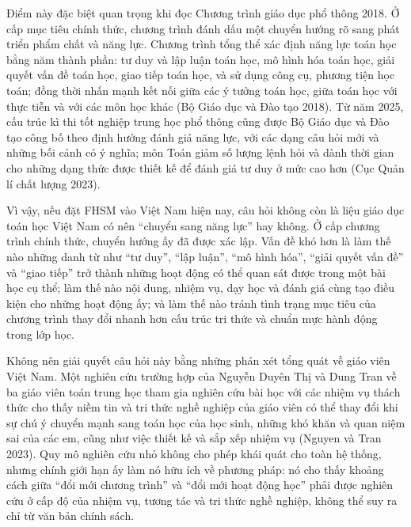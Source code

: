 Điểm này đặc biệt quan trọng khi đọc Chương trình giáo dục phổ thông 2018.
Ở cấp mục tiêu chính thức, chương trình đánh dấu một chuyển hướng rõ sang
phát triển phẩm chất và năng lực. Chương trình tổng thể xác định năng lực toán
học bằng năm thành phần: tư duy và lập luận toán học, mô hình hóa toán học,
giải quyết vấn đề toán học, giao tiếp toán học, và sử dụng công cụ, phương tiện
học toán; đồng thời nhấn mạnh kết nối giữa các ý tưởng toán học, giữa toán học
với thực tiễn và với các môn học khác (Bộ Giáo dục và Đào tạo 2018). Từ năm
2025, cấu trúc kì thi tốt nghiệp trung học phổ thông cũng được Bộ Giáo dục và
Đào tạo công bố theo định hướng đánh giá năng lực, với các dạng câu hỏi mới và
những bối cảnh có ý nghĩa; môn Toán giảm số lượng lệnh hỏi và dành thời gian
cho những dạng thức được thiết kế để đánh giá tư duy ở mức cao hơn
(Cục Quản lí chất lượng 2023).

Vì vậy, nếu đặt FHSM vào Việt Nam hiện nay, câu hỏi không còn là liệu giáo dục
toán học Việt Nam có nên ``chuyển sang năng lực'' hay không. Ở cấp chương
trình chính thức, chuyển hướng ấy đã được xác lập. Vấn đề khó hơn là làm thế
nào những danh từ như ``tư duy'', ``lập luận'', ``mô hình hóa'', ``giải quyết
vấn đề'' và ``giao tiếp'' trở thành những hoạt động có thể quan sát được trong
một bài học cụ thể; làm thế nào nội dung, nhiệm vụ, dạy học và đánh giá cùng
tạo điều kiện cho những hoạt động ấy; và làm thế nào tránh tình trạng mục tiêu
của chương trình thay đổi nhanh hơn cấu trúc tri thức và chuẩn mực hành động
trong lớp học.

Không nên giải quyết câu hỏi này bằng những phán xét tổng quát về giáo viên
Việt Nam. Một nghiên cứu trường hợp của Nguyễn Duyên Thị và Dung Tran về ba
giáo viên toán trung học tham gia nghiên cứu bài học với các nhiệm vụ thách
thức cho thấy niềm tin và tri thức nghề nghiệp của giáo viên có thể thay đổi
khi sự chú ý chuyển mạnh sang toán học của học sinh, những khó khăn và quan
niệm sai của các em, cũng như việc thiết kế và sắp xếp nhiệm vụ
(Nguyen và Tran 2023). Quy mô nghiên cứu nhỏ không cho phép khái quát cho toàn
hệ thống, nhưng chính giới hạn ấy làm nó hữu ích về phương pháp: nó cho thấy
khoảng cách giữa ``đổi mới chương trình'' và ``đổi mới hoạt động học'' phải
được nghiên cứu ở cấp độ của nhiệm vụ, tương tác và tri thức nghề nghiệp,
không thể suy ra chỉ từ văn bản chính sách.

